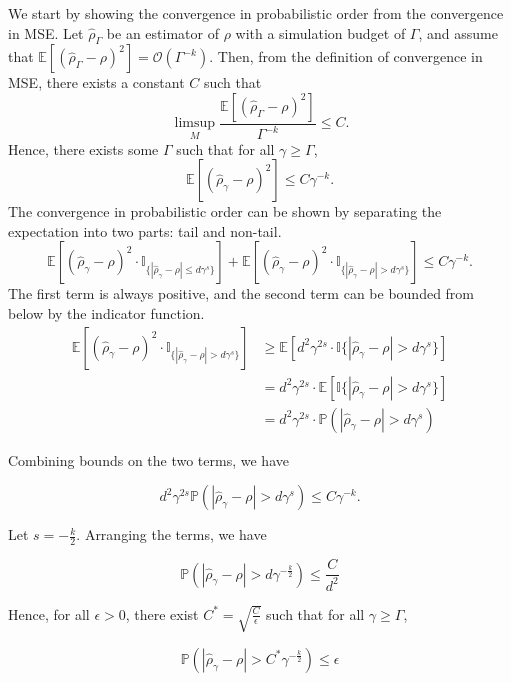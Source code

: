 We start by showing the convergence in probabilistic order from the convergence in MSE.
Let $\hat{\rho}_{\Gamma}$ be an estimator of $\rho$ with a simulation budget of $\Gamma$, and assume that $\mathbb{E} \left[ \left(\hat{\rho}_{\Gamma} - \rho\right)^2 \right] = \mathcal{O} \left( \Gamma^{-k} \right)$.
Then, from the definition of convergence in MSE, there exists a constant $C$ such that 
$$
    \limsup_{M} \frac{\mathbb{E} \left[ \left(\hat{\rho}_{\Gamma} - \rho\right)^2 \right]}{\Gamma^{-k}} \leq C.
$$
Hence, there exists some $\Gamma$ such that for all $\gamma \geq \Gamma$,
$$
\mathbb{E} \left[ \left(\hat{\rho}_{\gamma} - \rho\right)^2 \right] \leq C\gamma^{-k}.
$$
The convergence in probabilistic order can be shown by separating the expectation into two parts: tail and non-tail.
$$
\mathbb{E} \left[ \left(\hat{\rho}_{\gamma} - \rho\right)^2 \cdot \mathbb{I}_{\{|\hat{\rho}_{\gamma} - \rho| \leq d\gamma^s\}} \right] + \mathbb{E} \left[ \left(\hat{\rho}_{\gamma} - \rho\right)^2 \cdot \mathbb{I}_{\{|\hat{\rho}_{\gamma} - \rho| > d\gamma^s\}} \right] \leq C\gamma^{-k}.
$$
The first term is always positive, and the second term can be bounded from below by the indicator function.
\begin{align*}
\mathbb{E} \left[ \left(\hat{\rho}_{\gamma} - \rho\right)^2 \cdot \mathbb{I}_{\{|\hat{\rho}_{\gamma} - \rho| > d\gamma^s\}} \right] 
& \geq \mathbb{E} \left[ d^2 \gamma^{2s} \cdot \mathbb{I}\{|\hat{\rho}_{\gamma} - \rho| > d\gamma^s\} \right] \\
& = d^2 \gamma^{2s} \cdot \mathbb{E} \left[ \mathbb{I}\{|\hat{\rho}_{\gamma} - \rho| > d\gamma^s \} \right] \\
& = d^2 \gamma^{2s} \cdot \mathbb{P} \left(|\hat{\rho}_{\gamma} - \rho| > d\gamma^s \right)
\end{align*}

Combining bounds on the two terms, we have

$$
    d^2 \gamma^{2s} \mathbb{P} \left(|\hat{\rho}_{\gamma} - \rho| > d\gamma^s \right) \leq C \gamma^{-k}.
$$

Let $s = -\frac{k}{2}$. Arranging the terms, we have

$$
    \mathbb{P} \left( |\hat{\rho}_{\gamma} - \rho| > d\gamma^{-\frac{k}{2}} \right) \leq \frac{C}{d^2}
$$

Hence, for all $\epsilon >0$, there exist $C^* = \sqrt{\frac{C}{\epsilon}}$ such that for all $\gamma \geq \Gamma$,

$$
    \mathbb{P} \left( |\hat{\rho}_{\gamma} - \rho| > C^*\gamma^{-\frac{k}{2}} \right) \leq \epsilon
$$

